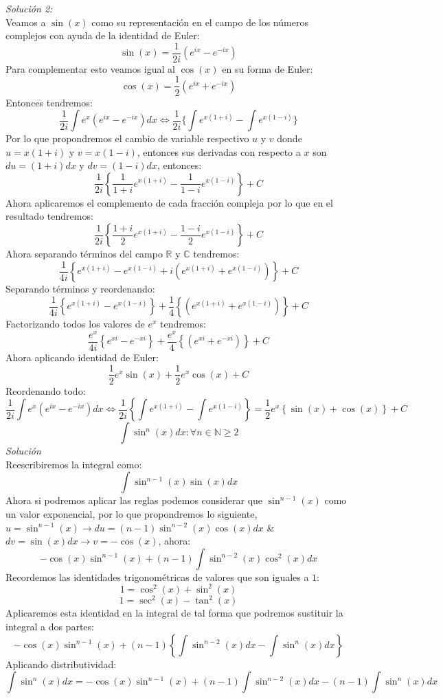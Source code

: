\documentclass[10pt,executivepaper]{article}
\begin{document}
\textit{Solución 2:}\\
Veamos a $\sin(x)$ como su representación en el campo de los números complejos con ayuda de la identidad de Euler:
\[\sin(x)= \frac{1}{2i}(e^{ix}-e^{-ix})\]
Para complementar esto veamos igual al $\cos(x)$ en su forma de Euler:
\[\cos(x)= \frac{1}{2}(e^{ix}+e^{-ix})\]
Entonces tendremos:
\[\frac{1}{2i}\int e^{x}(e^{ix}-e^{-ix})dx \Leftrightarrow \frac{1}{2i}\{\int e^{x(1+i)} - \int e^{x(1-i)}\}\]
Por lo que propondremos el cambio de variable respectivo $u$ y $v$ donde $u=x(1+i)$ y $v=x(1-i)$, entonces sus derivadas con respecto a $x$ son $du=(1+i)dx$ y $dv=(1-i)dx$, entonces:
\[\frac{1}{2i}\left\{\frac{1}{1+i}e^{x(1+i)}-\frac{1}{1-i}e^{x(1-i)}\right\}+C\]
Ahora aplicaremos el complemento de cada fracción compleja por lo que en el resultado tendremos:
\[\frac{1}{2i}\left\{\frac{1+i}{2}e^{x(1+i)}-\frac{1-i}{2}e^{x(1-i)}\right\}+C\]
Ahora separando términos del campo $\mathbb{R}$ y $\mathbb{C}$ tendremos:
\[\frac{1}{4i}\left\{e^{x(1+i)}-e^{x(1-i)} + i(e^{x(1+i)}+e^{x(1-i)})\right\}+C\]
Separando términos y reordenando:
\[\frac{1}{4i}\left\{e^{x(1+i)}-e^{x(1-i)}\right\} + \frac{1}{4}\left\{(e^{x(1+i)}+e^{x(1-i)})\right\}+C\]
Factorizando todos los valores de $e^{x}$ tendremos:
\[\frac{e^{x}}{4i}\left\{e^{xi}-e^{-xi}\right\} + \frac{e^{x}}{4}\left\{(e^{xi}+e^{-xi})\right\}+C\]
Ahora aplicando identidad de Euler:
\[\frac{1}{2}e^{x}\sin(x) + \frac{1}{2}e^{x}\cos(x)+C\]
Reordenando todo:
\[\frac{1}{2i}\int e^{x}(e^{ix}-e^{-ix})dx \Leftrightarrow \frac{1}{2i}\left\{\int e^{x(1+i)} - \int e^{x(1-i)}\right\} = \frac{1}{2}e^x\left\{\sin(x)+\cos(x)\right\}+C\]
\clearpage
\[\int \sin^{n}(x)dx \colon \forall n\in\mathbb{N}\geq 2\]
\textit{Solución}\\
Reescribiremos la integral como:
\[\int \sin^{n-1}(x)\sin(x)dx\]
Ahora si podremos aplicar las reglas podemos considerar que $\sin^{n-1}(x)$ como un valor exponencial, por lo que propondremos lo siguiente, $u=\sin^{n-1}(x) \rightarrow du=(n-1)\sin^{n-2}(x)\cos(x)dx$ \& $dv = \sin(x)dx \rightarrow v=-\cos(x)$, ahora:
\[-\cos(x)\sin^{n-1}(x) + (n-1)\int \sin^{n-2}(x)\cos^{2}(x)dx\]
Recordemos las identidades trigonométricas de valores que son iguales a $1$:
\[1=\cos^2(x)+\sin^{2}(x)\]
\[1=\sec^{2}(x)-\tan^{2}(x)\]
Aplicaremos esta identidad en la integral de tal forma que podremos sustituir la integral a dos partes:
\[-\cos(x)\sin^{n-1}(x) + (n-1)\left\{\int \sin^{n-2}(x)dx -\int\sin^{n}(x)dx\right\}\]
Aplicando distributividad:
\[\int\sin^{n}(x)dx=-\cos(x)\sin^{n-1}(x) + (n-1)\int \sin^{n-2}(x)dx -(n-1)\int\sin^{n}(x)dx\]
\end{document}
